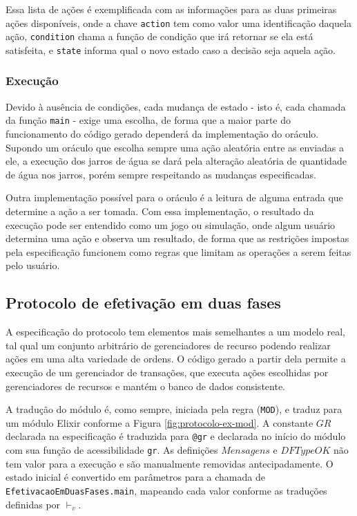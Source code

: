Essa lista de ações é exemplificada com as informações para as duas primeiras
ações disponíveis, onde a chave \texttt{action} tem como valor uma identificação
daquela ação, \texttt{condition} chama a função de condição que irá retornar se
ela está satisfeita, e \texttt{state} informa qual o novo estado caso a decisão
seja aquela ação.

\subsubsection{Execução}

Devido à ausência de condições, cada mudança de estado - isto é, cada chamada da
função \texttt{main} - exige uma escolha, de forma que a maior parte do
funcionamento do código gerado dependerá da implementação do oráculo. Supondo um
oráculo que escolha sempre uma ação aleatória entre as enviadas a ele, a
execução dos jarros de água se dará pela alteração aleatória de quantidade de
água nos jarros, porém sempre respeitando as mudanças especificadas.

Outra implementação possível para o oráculo é a leitura de alguma entrada que
determine a ação a ser tomada. Com essa implementação, o resultado da execução
pode ser entendido como um jogo ou simulação, onde algum usuário determina uma
ação e observa um resultado, de forma que as restrições impostas pela
especificação funcionem como regras que limitam as operações a serem feitas pelo
usuário.

\subsection{Protocolo de efetivação em duas fases}


A especificação do protocolo tem elementos mais semelhantes a um modelo real,
tal qual um conjunto arbitrário de gerenciadores de recurso podendo realizar
ações em uma alta variedade de ordens. O código gerado a partir dela permite a
execução de um gerenciador de transações, que executa ações escolhidas por
gerenciadores de recursos e mantém o banco de dados consistente.

A tradução do módulo é, como sempre, iniciada pela regra (\texttt{MOD}), e
traduz para um módulo Elixir conforme a Figura \ref{fig:protocolo-ex-mod}. A
constante $GR$ declarada na especificação é traduzida para \texttt{@gr} e
declarada no início do módulo com sua função de acessibilidade \texttt{gr}. As
definições $Mensagens$ e $DFTypeOK$ não tem valor para a execução e são
manualmente removidas antecipadamente. O
estado inicial é convertido em parâmetros para a chamada de
\texttt{EfetivacaoEmDuasFases.main}, mapeando cada valor conforme as traduções
definidas por $\vdash_v$.

